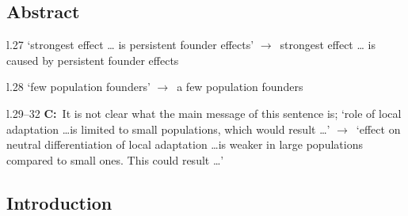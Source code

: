 \documentclass[11pt]{article}
\newenvironment{my_description}
{\begin{description}
  \setlength{\itemsep}{2pt}
  \setlength{\parskip}{0pt}
  \setlength{\parsep}{0pt}}
{\end{description}}
\newcommand{\ra}{$\rightarrow$\ }
\newcommand{\C}{\textbf{C:}\ }
\begin{document}
\subsection{Abstract}

\begin{my_description}
\item[l.27] `strongest effect \ldots{} is persistent founder effects' \ra strongest effect \ldots{} is caused by persistent founder effects
\item[l.28] `few population founders' \ra a few population founders
\item[l.29--32] \C It is not clear what the main message of this sentence is; `role of local adaptation \dots is limited to small populations, which would result \ldots' \ra `effect on neutral differentiation of local adaptation \dots is weaker in large populations compared to small ones. This could result \ldots'
\end{my_description}


\subsection{Introduction}
\end{document}
